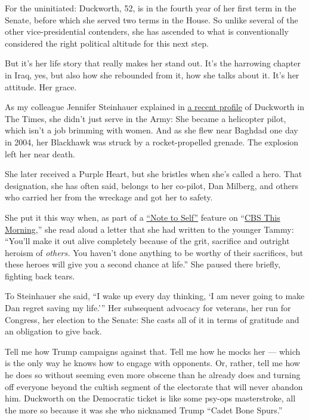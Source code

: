 For the uninitiated: Duckworth, 52, is in the fourth year of her first
term in the Senate, before which she served two terms in the House. So
unlike several of the other vice-presidential contenders, she has
ascended to what is conventionally considered the right political
altitude for this next step.

But it's her life story that really makes her stand out. It's the
harrowing chapter in Iraq, yes, but also how she rebounded from it, how
she talks about it. It's her attitude. Her grace.

As my colleague Jennifer Steinhauer explained in
\href{https://www.nytimes.com/2020/06/25/us/politics/tammy-duckworth-vice-president-joe-biden.html}{a
recent profile} of Duckworth in The Times, she didn't just serve in the
Army: She became a helicopter pilot, which isn't a job brimming with
women. And as she flew near Baghdad one day in 2004, her Blackhawk was
struck by a rocket-propelled grenade. The explosion left her near death.

She later received a Purple Heart, but she bristles when she's called a
hero. That designation, she has often said, belongs to her co-pilot, Dan
Milberg, and others who carried her from the wreckage and got her to
safety.

She put it this way when, as part of a
\href{https://www.cbsnews.com/news/note-to-self-senator-tammy-duckworth/}{``Note
to Self''} feature on
``\href{https://www.cbsnews.com/news/note-to-self-senator-tammy-duckworth/}{CBS
This Morning},'' she read aloud a letter that she had written to the
younger Tammy: ``You'll make it out alive completely because of the
grit, sacrifice and outright heroism of \emph{others.} You haven't done
anything to be worthy of their sacrifices, but these heroes will give
you a second chance at life.'' She paused there briefly, fighting back
tears.

To Steinhauer she said, ``I wake up every day thinking, `I am never
going to make Dan regret saving my life.''' Her subsequent advocacy for
veterans, her run for Congress, her election to the Senate: She casts
all of it in terms of gratitude and an obligation to give back.

Tell me how Trump campaigns against that. Tell me how he mocks her ---
which is the only way he knows how to engage with opponents. Or, rather,
tell me how he does so without seeming even more obscene than he already
does and turning off everyone beyond the cultish segment of the
electorate that will never abandon him. Duckworth on the Democratic
ticket is like some psy-ops masterstroke, all the more so because it was
she who nicknamed Trump ``Cadet Bone Spurs.''

